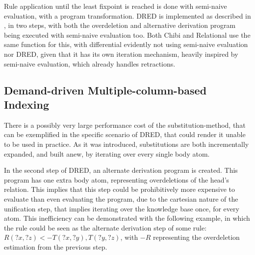 \documentclass[sigconf,screen,review=false,natbib]{acmart}
\theoremstyle{definition}
\begin{document}
Rule application until the least fixpoint is reached is done with semi-naive evaluation\cite{abiteboul}, with a program
transformation. DRED is implemented as described in \cite{dred}, in two steps, with both the overdeletion and alternative
derivation program being executed with semi-naive evaluation too. Both Chibi and Relational use the same function for this,
with differential evidently not using semi-naive evaluation nor DRED, given that it has its own iteration mechanism, heavily
inspired by semi-naive evaluation, which already handles retractions.
\subsection{Demand-driven Multiple-column-based Indexing}
There is a possibly very large performance cost of the substitution-method, that can be exemplified in the specific scenario
of DRED, that could render it unable to be used in practice. As it was introduced, substitutions are both incrementally expanded,
and built anew, by iterating over every single body atom.

In the second step of DRED, an alternate derivation program is created. This program has one extra body atom, representing
overdeletions of the head's relation. This implies that this step could be prohibitively more expensive to evaluate than even
evaluating the program, due to the cartesian nature of the unification step, that implies iterating over the knowledge base once, for
every atom. This inefficiency can be demonstrated with the following example, in which the rule could be seen as the alternate derivation
step of some rule: $R(?x, ?z) <- T(?x, ?y), T(?y, ?z)$, with $-R$ representing the overdeletion estimation from the previous step.
\end{document}

